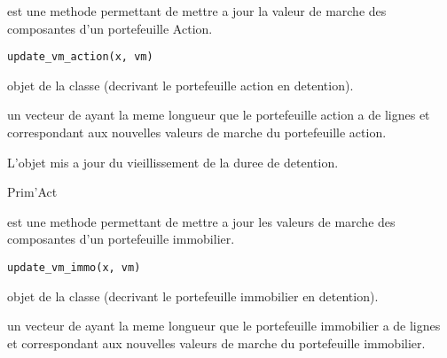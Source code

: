 \documentclass[a4paper]{book}
\begin{document}
%
\begin{Description}\relax
{} est une methode permettant de mettre a jour la valeur de marche des composantes d'un portefeuille Action.
\end{Description}
%
\begin{Usage}
\begin{verbatim}
update_vm_action(x, vm)
\end{verbatim}
\end{Usage}
%
\begin{Arguments}
\begin{ldescription}
\item[\code{x}] objet de la classe  (decrivant le portefeuille action en detention).

\item[\code{vm}] un vecteur de  ayant la meme longueur que le portefeuille action a de lignes et correspondant aux nouvelles valeurs de marche du portefeuille action.
\end{ldescription}
\end{Arguments}
%
\begin{Value}
L'objet  mis a jour du vieillissement de la duree de detention.
\end{Value}
%
\begin{Author}\relax
Prim'Act
\end{Author}
%
\begin{Description}\relax
{} est une methode permettant de mettre a jour les valeurs de marche des composantes d'un portefeuille immobilier.
\end{Description}
%
\begin{Usage}
\begin{verbatim}
update_vm_immo(x, vm)
\end{verbatim}
\end{Usage}
%
\begin{Arguments}
\begin{ldescription}
\item[\code{x}] objet de la classe  (decrivant le portefeuille immobilier en detention).

\item[\code{vm}] un vecteur de  ayant la meme longueur que le portefeuille immobilier a de lignes et correspondant aux nouvelles valeurs de marche du portefeuille immobilier.
\end{ldescription}
\end{Arguments}
\end{document}

